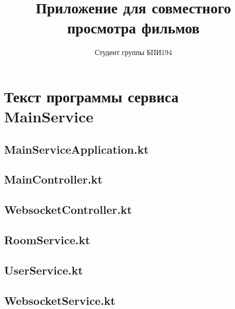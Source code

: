 \documentclass{../includes/TechDoc}
\title{Приложение для совместного просмотра фильмов}
\author{Студент группы БПИ194}{В. А. Анненков}
\begin{document}
    \maketitle

    \tableofcontents


    \section{Текст программы сервиса MainService}

    \subsection{MainServiceApplication.kt}
    

    \subsection{MainController.kt}
    

    \subsection{WebsocketController.kt}
    

    \subsection{RoomService.kt}
    

    \subsection{UserService.kt}
    

    \subsection{WebsocketService.kt}
    
\end{document}
